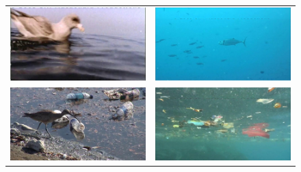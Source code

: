 \begin{figure}
{\begin{tabular}{rl}
{{\includegraphics[keepaspectratio=true,width=\iwith]{images/matrix/401_10.jpg}}}&
%
\colorbox{white!0}{ \colorbox{green!80}{
\includegraphics[keepaspectratio=true,width=\iwith]{images/matrix/5053_10.jpg}}}\\
%
\colorbox{red!70}{ \colorbox{green!80}{
\includegraphics[keepaspectratio=true,width=\iwith]{images/matrix/701_11.jpg}}}&
%
\colorbox{white!0}{ \colorbox{red!70}{
\includegraphics[keepaspectratio=true,width=\iwith]{images/matrix/6_01.jpg}}}

\end{tabular}}
\end{figure}
